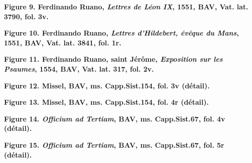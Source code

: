 \documentclass[12pt,twoside,openany]{book}
\begin{document}
\begin{center}
\par\small \textbf{Figure 9. Ferdinando Ruano, \textit{Lettres de Léon IX}, 1551, BAV, Vat. lat. 3790, fol. 3v.}
\end{center}

\begin{center}
\par\small \textbf{Figure 10. Ferdinando Ruano, \textit{Lettres d’Hildebert, évêque du Mans}, 1551, BAV, Vat. lat. 3841, fol. 1r.}
\end{center}

\begin{center}
\par\small \textbf{Figure 11. Ferdinando Ruano, saint Jérôme, \textit{Exposition sur les Psaumes}, 1554, BAV, Vat. lat. 317, fol. 2v.}
\end{center}

\begin{center}
\par\small \textbf{Figure 12. Missel, BAV, ms. Capp.Sist.154, fol. 3v (détail).}
\end{center}

\begin{center}
\par\small \textbf{Figure 13. Missel, BAV, ms. Capp.Sist.154, fol. 4r (détail).}
\end{center}

\begin{center}
\par\small \textbf{Figure 14. \textit{Officium ad Tertiam}, BAV, ms. Capp.Sist.67, fol. 4v (détail).}
\end{center}

\begin{center}
\par\small \textbf{Figure 15. \textit{Officium ad Tertiam}, BAV, ms. Capp.Sist.67, fol. 5r (détail).}
\end{center}
\end{document}
